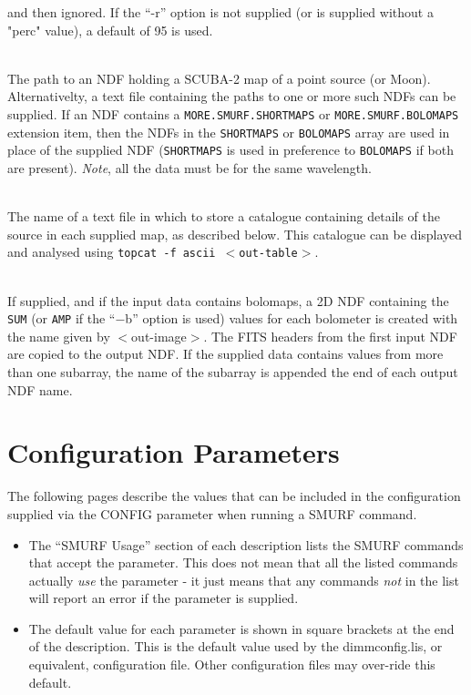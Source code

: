 \documentclass[twoside,11pt]{article}
\newcommand{\xlabel}[1]{}
\renewcommand{\_}{\texttt{\symbol{95}}}
\newcommand{\sstsubsection}[1]{ \item[{#1}] \mbox{} \\}
\newcommand{\sstsubsection}[1]{\item[{#1}]}
\begin{document}
{{{      and then ignored. If the ``-r'' option is not supplied (or is supplied
      without a "perc" value), a default of 95 is used.
    }
    \sstsubsection{
      $<$in-list$>$
    }{
      The path to an NDF holding a SCUBA-2 map of a point
      source (or Moon). Alternativelty, a text file containing the
      paths to one or more such NDFs can be supplied. If an NDF
      contains a \texttt{MORE.SMURF.SHORTMAPS} or \texttt{MORE.SMURF.BOLOMAPS}
      extension item, then the NDFs in the \texttt{SHORTMAPS} or \texttt{BOLOMAPS}
      array are used in place of the supplied NDF (\texttt{SHORTMAPS} is used
      in preference to \texttt{BOLOMAPS} if both are present). \textit{Note}, all the
      data must be for the same wavelength.
    }
    \sstsubsection{
      $<$out-table$>$
    }{
      The name of a text file in which to store a
      catalogue containing details of the source in each
      supplied map, as described below. This catalogue can
      be displayed and analysed using \texttt{topcat -f ascii
        $<$out-table$>$}.
    }
    \sstsubsection{
      $<$out-image$>$
    }{
      If supplied, and if the input data contains bolomaps,
      a 2D NDF containing the \texttt{SUM} (or \texttt{AMP} if the ``$-$b'' option is used)
      values for each bolometer is created with the name given by
      $<$out-image$>$. The FITS headers from the first input NDF are
      copied to the output NDF. If the supplied data contains values
      from more than one subarray, the name of the subarray is appended
      the end of each output NDF name.
    }
  }
}

\section{\xlabel{par_full}Configuration Parameters\label{par:full}}

The following pages describe the values that can be included in the
configuration supplied via the CONFIG parameter when running a SMURF
command.

\begin{itemize}
\item The ``SMURF Usage'' section of each description lists the SMURF
commands that accept the parameter. This does not mean that all the
listed commands actually \emph{use} the parameter - it just means that
any commands \emph{not} in the list will report an error if the parameter
is supplied.
\item The default value for each parameter is shown in square brackets at
the end of the description. This is the default value used by the
dimmconfig.lis, or equivalent, configuration file. Other configuration
files may over-ride this default.
\end{itemize}


\end{document}
